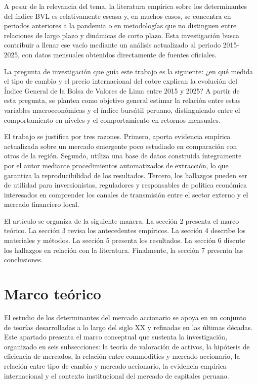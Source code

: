 \documentclass[12pt, a4paper]{article}
\begin{document}
A pesar de la relevancia del tema, la literatura empírica sobre los determinantes del índice BVL es relativamente escasa y, en muchos casos, se concentra en periodos anteriores a la pandemia o en metodologías que no distinguen entre relaciones de largo plazo y dinámicas de corto plazo. Esta investigación busca contribuir a llenar ese vacío mediante un análisis actualizado al periodo 2015-2025, con datos mensuales obtenidos directamente de fuentes oficiales.

La pregunta de investigación que guía este trabajo es la siguiente: ¿en qué medida el tipo de cambio y el precio internacional del cobre explican la evolución del Índice General de la Bolsa de Valores de Lima entre 2015 y 2025? A partir de esta pregunta, se plantea como objetivo general estimar la relación entre estas variables macroeconómicas y el índice bursátil peruano, distinguiendo entre el comportamiento en niveles y el comportamiento en retornos mensuales.

El trabajo se justifica por tres razones. Primero, aporta evidencia empírica actualizada sobre un mercado emergente poco estudiado en comparación con otros de la región. Segundo, utiliza una base de datos construida íntegramente por el autor mediante procedimientos automatizados de extracción, lo que garantiza la reproducibilidad de los resultados. Tercero, los hallazgos pueden ser de utilidad para inversionistas, reguladores y responsables de política económica interesados en comprender los canales de transmisión entre el sector externo y el mercado financiero local.

El artículo se organiza de la siguiente manera. La sección 2 presenta el marco teórico. La sección 3 revisa los antecedentes empíricos. La sección 4 describe los materiales y métodos. La sección 5 presenta los resultados. La sección 6 discute los hallazgos en relación con la literatura. Finalmente, la sección 7 presenta las conclusiones.

\section{Marco teórico}

El estudio de los determinantes del mercado accionario se apoya en un conjunto de teorías desarrolladas a lo largo del siglo XX y refinadas en las últimas décadas. Este apartado presenta el marco conceptual que sustenta la investigación, organizado en seis subsecciones: la teoría de valoración de activos, la hipótesis de eficiencia de mercados, la relación entre commodities y mercado accionario, la relación entre tipo de cambio y mercado accionario, la evidencia empírica internacional y el contexto institucional del mercado de capitales peruano.
\end{document}
